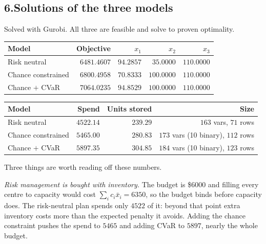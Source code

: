 \documentclass[11pt]{article}
\theoremstyle{definition}\newtheorem*{definition}{Definition}
\theoremstyle{definition}
\begin{document}
\subsection*{6.\quad Solutions of the three models}

Solved with Gurobi. All three are feasible and solve to proven
optimality.

\begin{center}
\begin{tabular}{@{}lrrrr@{}}
\toprule
Model & Objective & $x_1$ & $x_2$ & $x_3$ \\
\midrule
Risk neutral          & $6481.4607$ & $94.2857$ & $35.0000$ & $110.0000$ \\
Chance constrained    & $6800.4958$ & $70.8333$ & $100.0000$ & $110.0000$ \\
Chance $+$ CVaR       & $7064.0235$ & $94.8529$ & $100.0000$ & $110.0000$ \\
\bottomrule
\end{tabular}
\end{center}

\begin{center}
\begin{tabular}{@{}lrrr@{}}
\toprule
Model & Spend & Units stored & Size \\
\midrule
Risk neutral       & $4522.14$ & $239.29$ & $163$ vars, $71$ rows \\
Chance constrained & $5465.00$ & $280.83$ & $173$ vars (10 binary),
  $112$ rows \\
Chance $+$ CVaR    & $5897.35$ & $304.85$ & $184$ vars (10 binary),
  $123$ rows \\
\bottomrule
\end{tabular}
\end{center}

Three things are worth reading off these numbers.

\emph{Risk management is bought with inventory.} The budget is \$6000 and
filling every centre to capacity would cost
$\sum_i c_i \bar{x}_i = 6350$, so the budget binds before capacity does.
The risk-neutral plan spends only $4522$ of it: beyond that point extra
inventory costs more than the expected penalty it avoids. Adding the
chance constraint pushes the spend to $5465$ and adding CVaR to $5897$,
nearly the whole budget.
\end{document}
